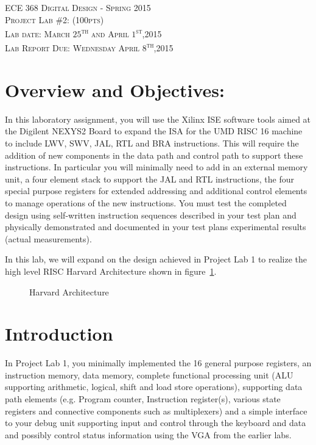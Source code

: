 \documentclass{article}
\begin{document}
\begin{center}
\textsc{\huge ECE 368 Digital Design - Spring 2015}\\[1cm]
\textsc{{\LARGE Project Lab \#2: (100pts)}}\\[0.5cm]
\textsc{\Large Lab date: March $25$\textsuperscript{th} and April $1$\textsuperscript{st},2015}\\[0.5cm]
\textsc{\Large Lab Report Due: Wednesday April $8$\textsuperscript{th},2015}\\[1cm]
\end{center}

\section{Overview and Objectives:}
In this laboratory assignment, you will use the Xilinx ISE software tools aimed at the Digilent NEXYS2 Board to expand the ISA for the UMD RISC 16 machine to include LWV, SWV, JAL, RTL and BRA instructions. This will require the addition of new components in the data path and control path to support these instructions. In particular you will minimally need to add in an external memory unit, a four element stack to support the JAL and RTL instructions, the four special purpose registers for extended addressing and additional control elements to manage operations of the new instructions. You must test the completed design using self-written instruction sequences described in your test plan and physically demonstrated and documented in your test plans experimental results (actual measurements).

In this lab, we will expand on the design achieved in Project Lab 1 to realize the high level RISC Harvard Architecture shown in figure~\ref{fig:harvardarc}.

\begin{figure}[!htbp]
  \centering
  \caption{Harvard Architecture}
  \label{fig:harvardarc}
\end{figure}
\FloatBarrier

\section{Introduction}

In Project Lab 1, you minimally implemented the 16 general purpose registers, an instruction memory, data memory, complete functional processing unit (ALU supporting arithmetic, logical, shift and load store operations), supporting data path elements (e.g. Program counter, Instruction  register(s), various state registers and connective components such as multiplexers) and a simple interface to your debug unit supporting input and control through the keyboard and data and possibly control status information using the VGA from the earlier labs. 
\end{document}
